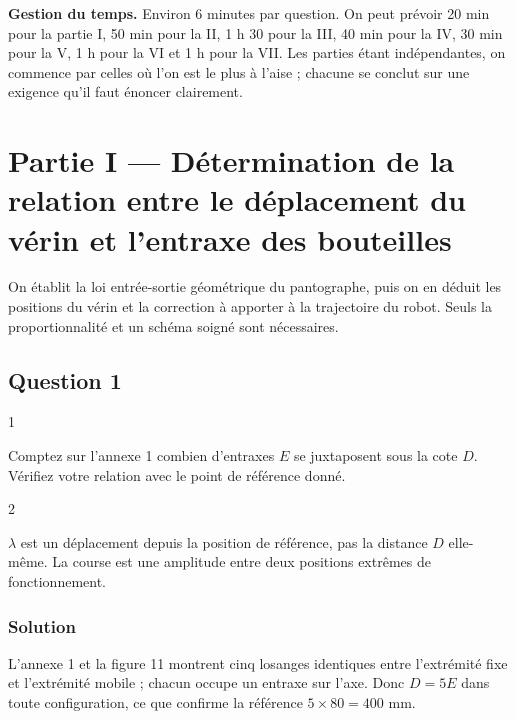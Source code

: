 \documentclass[11pt,a4paper]{article}
\begin{document}
\textbf{Gestion du temps.} Environ 6 minutes par question. On peut prévoir 20 min pour la partie I, 50 min pour la II, 1 h 30 pour la III, 40 min pour la IV, 30 min pour la V, 1 h pour la VI et 1 h pour la VII. Les parties étant indépendantes, on commence par celles où l'on est le plus à l'aise ; chacune se conclut sur une exigence qu'il faut énoncer clairement.

\hypertarget{partie-i-duxe9termination-de-la-relation-entre-le-duxe9placement-du-vuxe9rin-et-lentraxe-des-bouteilles}{%
\section{Partie I --- Détermination de la relation entre le déplacement du vérin et l'entraxe des bouteilles}\label{partie-i-duxe9termination-de-la-relation-entre-le-duxe9placement-du-vuxe9rin-et-lentraxe-des-bouteilles}}

On établit la loi entrée-sortie géométrique du pantographe, puis on en déduit les positions du vérin et la correction à apporter à la trajectoire du robot. Seuls la proportionnalité et un schéma soigné sont nécessaires.

\hypertarget{question-1}{%
\subsection{Question 1}\label{question-1}}

\begin{indication}{1}

Comptez sur l'annexe 1 combien d'entraxes \(E\) se juxtaposent sous la cote \(D\). Vérifiez votre relation avec le point de référence donné.

\end{indication}

\begin{indication}{2}

\(\lambda\) est un déplacement depuis la position de référence, pas la distance \(D\) elle-même. La course est une amplitude entre deux positions extrêmes de fonctionnement.

\end{indication}

\hypertarget{solution}{%
\subsubsection{Solution}\label{solution}}

L'annexe 1 et la figure 11 montrent cinq losanges identiques entre l'extrémité fixe et l'extrémité mobile ; chacun occupe un entraxe sur l'axe. Donc \(D=5E\) dans toute configuration, ce que confirme la référence \(5\times80=400\) mm.
\end{document}
